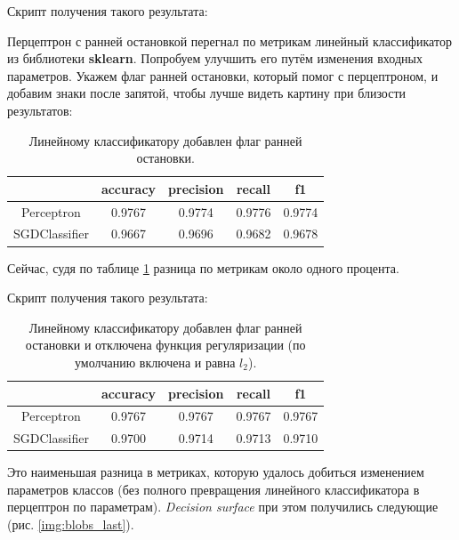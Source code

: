 Скрипт получения такого результата:

\noindent{}

Перцептрон с ранней остановкой перегнал по метрикам линейный классификатор из библиотеки \textbf{sklearn}. Попробуем улучшить его путём изменения входных параметров. Укажем флаг ранней остановки, который помог с перцептроном, и добавим знаки после запятой, чтобы лучше видеть картину при близости результатов:

\begin{table}[!h]
	\centering
	\begin{tabular}{|c|c|c|c|c|}
		\hline
		& \textbf{accuracy} & \textbf{precision} & \textbf{recall} & \textbf{f1} \\\hline
		Perceptron       & 0.9767 & 0.9774 & 0.9776 & 0.9774 \\\hline
		SGDClassifier    & 0.9667 & 0.9696 & 0.9682 & 0.9678 \\\hline
	\end{tabular}
	\caption{Линейному классификатору добавлен флаг ранней остановки. }
	\label{tbl:close_blobs}
\end{table}

Сейчас, судя по таблице \ref{tbl:close_blobs} разница по метрикам около одного процента.

Скрипт получения такого результата:

\noindent{}

\begin{table}[!h]
	\centering
	\begin{tabular}{|c|c|c|c|c|}
		\hline
		& \textbf{accuracy} & \textbf{precision} & \textbf{recall} & \textbf{f1} \\\hline
		Perceptron       & 0.9767 & 0.9767 & 0.9767 & 0.9767 \\\hline
		SGDClassifier    & 0.9700 & 0.9714 & 0.9713 & 0.9710 \\\hline
	\end{tabular}
	\caption{Линейному классификатору добавлен флаг ранней остановки и отключена функция регуляризации (по умолчанию включена и равна $l_2$).}
\end{table}

Это наименьшая разница в метриках, которую удалось добиться изменением параметров классов (без полного превращения линейного классификатора в перцептрон по параметрам). \textit{Decision surface} при этом получились следующие (рис. \ref{img:blobs_last}).

